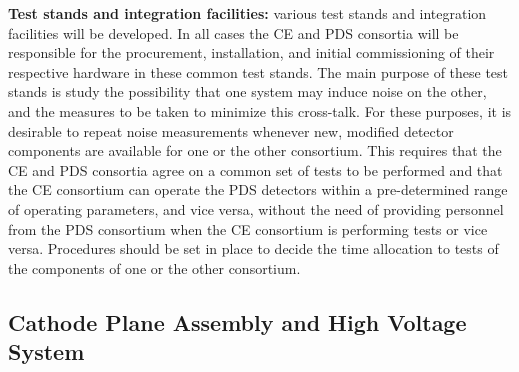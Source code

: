 \textbf{Test stands and integration facilities: }various test stands and integration facilities will be developed. In all cases the CE and PDS consortia will be responsible for the procurement, installation, and initial commissioning of their respective hardware in these common test stands. The main purpose of these test stands is study the possibility that one system may induce noise on the other, and the measures to be taken to minimize this cross-talk. For these purposes, it is desirable to repeat noise measurements whenever new, modified detector components are available for one or the other consortium. This requires that the CE and PDS consortia agree on a common set of tests to be performed and that the CE consortium can operate the PDS detectors within a pre-determined range of operating parameters, and vice versa, without the need of providing personnel from the PDS consortium when the CE consortium is performing tests or vice versa. Procedures should be set in place to decide the time allocation to tests of the components of one or the other consortium.


\subsection{Cathode Plane Assembly and High Voltage System}
\label{sec:fdsp-pd-intfc-le}


